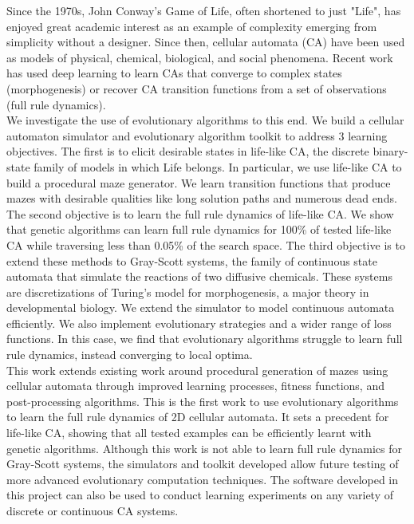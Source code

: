 
Since the 1970s, John Conway's Game of Life, often shortened to just "Life", has enjoyed great academic interest as an example of complexity emerging from simplicity without a designer. Since then, cellular automata (CA) have been used as models of physical\cite{wolf2004lattice}, chemical\cite{gray1983autocatalytic}, biological\cite{deutsch2021bio}, and social phenomena\cite{white2000high}. Recent work has used deep learning to learn CAs that converge to complex states (morphogenesis)\cite{mordvintsev2020growing} or recover CA transition functions from a set of observations (full rule dynamics)\cite{wulff1992learning}.\\

We investigate the use of evolutionary algorithms to this end. We build a cellular automaton simulator and evolutionary algorithm toolkit to address 3 learning objectives. The first is to elicit desirable states in life-like CA, the discrete binary-state family of models in which Life belongs. In particular, we use life-like CA to build a procedural maze generator. We learn transition functions that produce mazes with desirable qualities like long solution paths and numerous dead ends. The second objective is to learn the full rule dynamics of life-like CA. We show that genetic algorithms can learn full rule dynamics for 100\% of tested life-like CA while traversing less than 0.05\% of the search space. The third objective is to extend these methods to Gray-Scott systems, the family of continuous state automata that simulate the reactions of two diffusive chemicals. These systems are discretizations of Turing's model for morphogenesis, a major theory in developmental biology. We extend the simulator to model continuous automata efficiently. We also implement evolutionary strategies and a wider range of loss functions. In this case, we find that evolutionary algorithms struggle to learn full rule dynamics, instead converging to local optima.\\

This work extends existing work around procedural generation of mazes using cellular automata\cite{adams2017procedural} through improved learning processes, fitness functions, and post-processing algorithms. This is the first work to use evolutionary algorithms to learn the full rule dynamics of 2D cellular automata. It sets a precedent for life-like CA, showing that all tested examples can be efficiently learnt with genetic algorithms. Although this work is not able to learn full rule dynamics for Gray-Scott systems, the simulators and toolkit developed allow future testing of more advanced evolutionary computation techniques. The software developed in this project can also be used to conduct learning experiments on any variety of discrete or continuous CA systems.\\